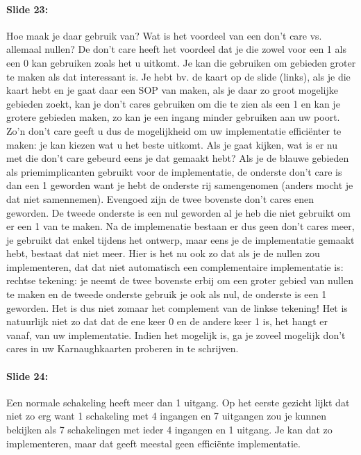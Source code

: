 \documentclass[10pt,a4paper]{book}
\begin{document}
\paragraph{Slide 23:} Hoe maak je daar gebruik van? Wat is het voordeel van een don't care vs. allemaal nullen? De don't care heeft het voordeel dat je die zowel voor een 1 als een 0 kan gebruiken zoals het u uitkomt. Je kan die gebruiken om gebieden groter te maken als dat interessant is. Je hebt bv. de kaart op de slide (links), als je die kaart hebt en je gaat daar een SOP van maken, als je daar zo groot mogelijke gebieden zoekt, kan je don't cares gebruiken om die te zien als een 1 en kan je grotere gebieden maken, zo kan je een ingang minder gebruiken aan uw poort. Zo'n don't care geeft u dus de mogelijkheid om uw implementatie effici\"enter te maken: je kan kiezen wat u het beste uitkomt. Als je gaat kijken, wat is er nu met die don't care gebeurd eens je dat gemaakt hebt? Als je de blauwe gebieden als priemimplicanten gebruikt voor de implementatie, de onderste don't care is dan een 1 geworden want je hebt de onderste rij samengenomen (anders mocht je dat niet samennemen). Evengoed zijn de twee bovenste don't cares enen geworden. De tweede onderste is een nul geworden al je heb die niet gebruikt om er een 1 van te maken. Na de implemenatie bestaan er dus geen don't cares meer, je gebruikt dat enkel tijdens het ontwerp, maar eens je de implementatie gemaakt hebt, bestaat dat niet meer. Hier is het nu ook zo dat als je de nullen zou implementeren, dat dat niet automatisch een complementaire implementatie is: rechtse tekening: je neemt de twee bovenste erbij om een groter gebied van nullen te maken en de tweede onderste gebruik je ook als nul, de onderste is een 1 geworden. Het is dus niet zomaar het complement van de linkse tekening! Het is natuurlijk niet zo dat dat de ene keer 0 en de andere keer 1 is, het hangt er vanaf, van uw implementatie. Indien het mogelijk is, ga je zoveel mogelijk don't cares in uw Karnaughkaarten proberen in te schrijven.

\paragraph{Slide 24:} Een normale schakeling heeft meer dan 1 uitgang. Op het eerste gezicht lijkt dat niet zo erg want 1 schakeling met 4 ingangen en 7 uitgangen zou je kunnen bekijken als 7 schakelingen met ieder 4 ingangen en 1 uitgang. Je kan dat zo implementeren, maar dat geeft meestal geen effici\"ente implementatie.
\end{document}
